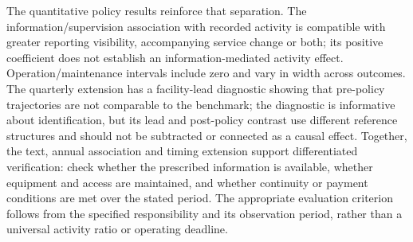 The quantitative policy results reinforce that separation. The information/supervision association with recorded activity is compatible with greater reporting visibility, accompanying service change or both; its positive coefficient does not establish an information-mediated activity effect. Operation/maintenance intervals include zero and vary in width across outcomes. The quarterly extension has a facility-lead diagnostic showing that pre-policy trajectories are not comparable to the benchmark; the diagnostic is informative about identification, but its lead and post-policy contrast use different reference structures and should not be subtracted or connected as a causal effect. Together, the text, annual association and timing extension support differentiated verification: check whether the prescribed information is available, whether equipment and access are maintained, and whether continuity or payment conditions are met over the stated period. The appropriate evaluation criterion follows from the specified responsibility and its observation period, rather than a universal activity ratio or operating deadline.
